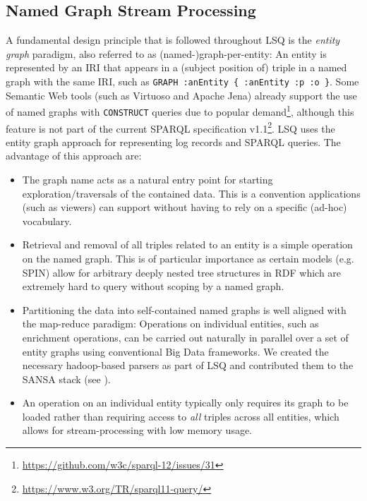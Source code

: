 \subsection{Named Graph Stream Processing}
A fundamental design principle that is followed throughout LSQ is the \emph{entity graph} paradigm, also referred to as (named-)graph-per-entity:
An entity is represented by an IRI that appears in a (subject position of) triple in a named graph with the same IRI, such as \texttt{GRAPH :anEntity \{ :anEntity :p :o \}}.
Some Semantic Web tools (such as Virtuoso and Apache Jena) already support the use of named graphs with \texttt{CONSTRUCT} queries due to popular demand\footnote{\url{https://github.com/w3c/sparql-12/issues/31}}, although this feature is not part of the current SPARQL specification v1.1\footnote{\url{https://www.w3.org/TR/sparql11-query/}}.
LSQ uses the entity graph approach for representing log records and SPARQL queries.
The advantage of this approach are:
\begin{itemize}
\item The graph name acts as a natural entry point for starting exploration/traversals of the contained data. This is a convention applications (such as viewers) can support without having to rely on a specific (ad-hoc) vocabulary.
\item Retrieval and removal of all triples related to an entity is a simple operation on the named graph. This is of particular importance as certain models (e.g. SPIN) allow for arbitrary deeply nested tree structures in RDF which are extremely hard to query without scoping by a named graph.
\item Partitioning the data into self-contained named graphs is well aligned with the map-reduce paradigm: Operations on individual entities, such as enrichment operations, can be carried out naturally in parallel over a set of entity graphs using conventional Big Data frameworks. We created the necessary hadoop-based parsers as part of LSQ and contributed them to the SANSA stack (see ).
\item An operation on an individual entity typically only requires its graph to be loaded rather than requiring access to \emph{all} triples across all entities, which allows for stream-processing with low memory usage.
\end{itemize}



